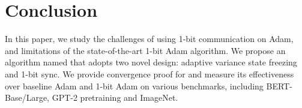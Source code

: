 \section{Conclusion}
In this paper, we study the challenges of using 1-bit communication on Adam, and limitations of the state-of-the-art 1-bit Adam algorithm. We propose an algorithm named {\myalgo} that adopts two novel design: adaptive variance state freezing and 1-bit sync. We provide convergence proof for {\myalgo} and measure its effectiveness over baseline Adam and 1-bit Adam on various benchmarks, including BERT-Base/Large, GPT-2 pretraining and ImageNet.